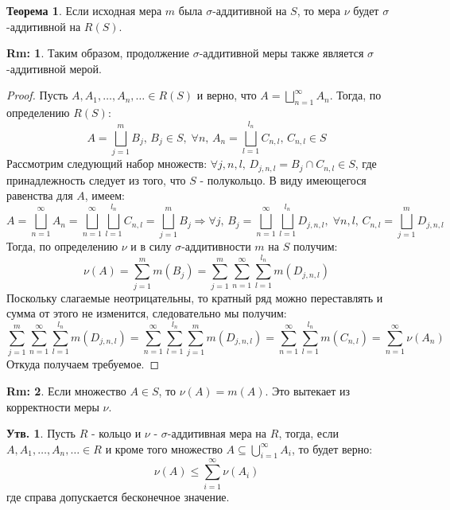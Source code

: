 \documentclass[12pt]{article}
\theoremstyle{definition}
\newtheorem{rem}{Rm:}
\newtheorem{prop}{Утв.}
\newtheorem{theorem}{Теорема}
\begin{document}
\newpage
\begin{theorem}
	Если исходная мера $m$ была $\sigma$-аддитивной на $S$, то мера $\nu$ будет $\sigma$-аддитивной на $R(S)$.
\end{theorem}
\begin{rem}
	Таким образом, продолжение $\sigma$-аддитивной меры также является  $\sigma$-аддитивной мерой. 
\end{rem}
\begin{proof}
	Пусть $A, A_1, \dotsc, A_n, \dotsc \in R(S)$ и верно, что $A = \bigsqcup\limits_{n = 1}^{\infty}A_n$. Тогда, по определению $R(S)$:
	$$
		A = \bigsqcup\limits_{j = 1}^m B_j, \, B_j \in S,\; \forall n, \, A_n = \bigsqcup\limits_{l = 1}^{l_n}C_{n,l},\, C_{n,l} \in S
	$$
	Рассмотрим следующий набор множеств: $\forall j, n, l, \, D_{j,n,l} = B_j \cap C_{n,l} \in S$, где принадлежность следует из того, что $S$ - полукольцо. В виду имеющегося равенства для $A$, имеем:
	$$
		A = \bigsqcup\limits_{n = 1}^{\infty}A_n = \bigsqcup\limits_{n = 1}^{\infty}\bigsqcup\limits_{l = 1}^{l_n}C_{n,l} = \bigsqcup\limits_{j = 1}^m B_j \Rightarrow \forall j, \, B_j = \bigsqcup\limits_{n = 1}^{\infty}\bigsqcup\limits_{l = 1}^{l_n} D_{j,n,l}, \; \forall n,l, \, C_{n,l} = \bigsqcup\limits_{j = 1}^m D_{j,n,l}
	$$
	Тогда, по определению $\nu$ и в силу $\sigma$-аддитивности $m$ на $S$ получим:
	$$
		\nu(A) = \sum\limits_{j = 1}^{m}m(B_j) = \sum\limits_{j = 1}^m \sum\limits_{n = 1}^{\infty}\sum\limits_{l = 1}^{l_n}m(D_{j,n,l})
	$$
	Поскольку слагаемые неотрицательны, то кратный ряд можно переставлять и сумма от этого не изменится, следовательно мы получим:
	$$
		\sum\limits_{j = 1}^m \sum\limits_{n = 1}^{\infty}\sum\limits_{l = 1}^{l_n}m(D_{j,n,l}) = \sum\limits_{n = 1}^{\infty} \sum\limits_{l = 1}^{l_n}\sum\limits_{j = 1}^m m(D_{j,n,l}) =  \sum\limits_{n = 1}^{\infty} \sum\limits_{l = 1}^{l_n} m(C_{n,l}) = \sum\limits_{n = 1}^{\infty} \nu(A_n)
	$$
	Откуда получаем требуемое.
\end{proof}
\begin{rem}
	Если множество $A \in S$, то $\nu(A) = m(A)$. Это вытекает из корректности меры $\nu$.
\end{rem}
\begin{prop}
	Пусть $R$ - кольцо и $\nu$ - $\sigma$-аддитивная мера на $R$, тогда, если $A, A_1, \dotsc, A_n, \dotsc \in R$ и кроме того множество $A \subseteq \bigcup\limits_{i = 1}^{\infty}A_i$, то будет верно:
	$$
		\nu(A) \leq \sum\limits_{i = 1}^{\infty}\nu(A_i)
	$$
	где справа допускается бесконечное значение.
\end{prop}
\end{document}
